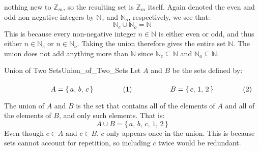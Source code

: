         nothing new to $\mathbb{Z}_{m}$, so the resulting set is
        $\mathbb{Z}_{m}$ itself. Again denoted the even and odd non-negative
        integers by $\mathbb{N}_{e}$ and $\mathbb{N}_{o}$, respectively,
        we see that:
        \begin{equation}
            \mathbb{N}_{e}\cup\mathbb{N}_{o}=\mathbb{N}
        \end{equation}
        This is because every non-negative integer $n\in\mathbb{N}$ is
        either even or odd, and thus either $n\in\mathbb{N}_{e}$ or
        $n\in\mathbb{N}_{o}$. Taking the union therefore gives the entire
        set $\mathbb{N}$. The union does not add anything more than
        $\mathbb{N}$ since $\mathbb{N}_{e}\subseteq\mathbb{N}$ and
        $\mathbb{N}_{o}\subseteq\mathbb{N}$.
        \begin{fexample}{Union of Two Sets}{Union_of_Two_Sets}
            Let $A$ and $B$ be the sets defined by:
            \par\hfill\par
            \begin{subequations}
                \begin{minipage}[b]{0.49\textwidth}
                    \begin{equation}
                        A=\{\,a,\,b,\,c\,\}
                    \end{equation}
                \end{minipage}
                \hfill
                \begin{minipage}[b]{0.49\textwidth}
                    \begin{equation}
                        B=\{\,c,\,1,\,2\,\}
                    \end{equation}
                \end{minipage}
            \end{subequations}
            \par\vspace{2.5ex}
            The union of $A$ and $B$ is the set that contains all of the
            elements of $A$ and all of the elements of $B$, and only such
            elements. That is:
            \begin{equation}
                A\cup{B}=\{\,a,\,b,\,c,\,1,\,2\,\}
            \end{equation}
            Even though $c\in{A}$ and $c\in{B}$, $c$ only appears once in the
            union. This is because sets cannot account for repetition, so
            including $c$ twice would be redundant.
        \end{fexample}
